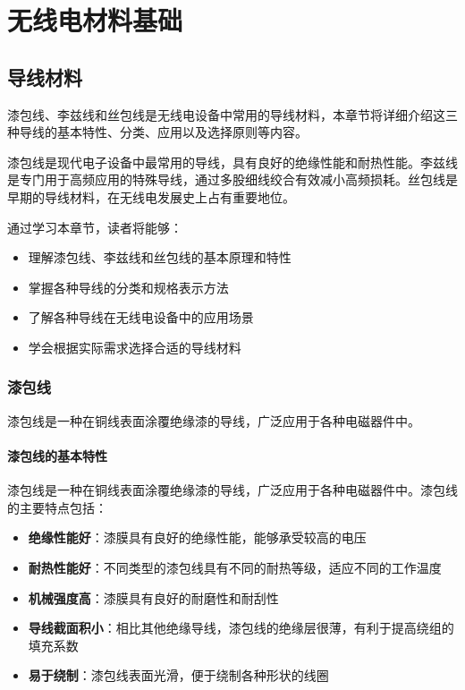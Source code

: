 \documentclass[12pt,UTF8]{ctexbook}
\begin{document}
\part{无线电材料基础}

\chapter{导线材料}

漆包线、李兹线和丝包线是无线电设备中常用的导线材料，本章节将详细介绍这三种导线的基本特性、分类、应用以及选择原则等内容。

漆包线是现代电子设备中最常用的导线，具有良好的绝缘性能和耐热性能。李兹线是专门用于高频应用的特殊导线，通过多股细线绞合有效减小高频损耗。丝包线是早期的导线材料，在无线电发展史上占有重要地位。

通过学习本章节，读者将能够：

\begin{itemize}[leftmargin=3.5em]
    \item 理解漆包线、李兹线和丝包线的基本原理和特性
    \item 掌握各种导线的分类和规格表示方法
    \item 了解各种导线在无线电设备中的应用场景
    \item 学会根据实际需求选择合适的导线材料
\end{itemize}

\section{漆包线}

漆包线是一种在铜线表面涂覆绝缘漆的导线，广泛应用于各种电磁器件中。

\subsection{漆包线的基本特性}

漆包线是一种在铜线表面涂覆绝缘漆的导线，广泛应用于各种电磁器件中。漆包线的主要特点包括：

\begin{itemize}[leftmargin=3.5em]
    \item \textbf{绝缘性能好}：漆膜具有良好的绝缘性能，能够承受较高的电压
    \item \textbf{耐热性能好}：不同类型的漆包线具有不同的耐热等级，适应不同的工作温度
    \item \textbf{机械强度高}：漆膜具有良好的耐磨性和耐刮性
    \item \textbf{导线截面积小}：相比其他绝缘导线，漆包线的绝缘层很薄，有利于提高绕组的填充系数
    \item \textbf{易于绕制}：漆包线表面光滑，便于绕制各种形状的线圈
\end{itemize}
\end{document}
